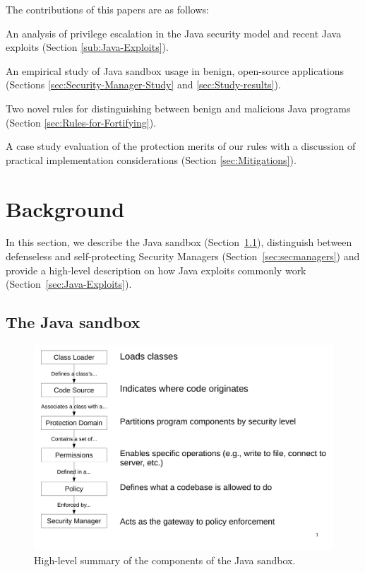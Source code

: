 \documentclass{sig-alternate}
\begin{document}
The contributions of this papers are as follows:
\begin{flushitem}	\setlength{\parskip}{0pt}
  \setlength{\parsep}{0pt}
  \setlength{\itemsep}{0pt}
\item An analysis of privilege escalation in the Java security model and
recent Java exploits (Section \ref{sub:Java-Exploits}).
\item An empirical study of Java sandbox usage in benign, open-source applications
(Sections \ref{sec:Security-Manager-Study} and \ref{sec:Study-results}).
\item Two novel rules for distinguishing between benign and malicious Java
programs (Section \ref{sec:Rules-for-Fortifying}).
\item A case study evaluation of the protection merits of our rules with a discussion of practical implementation considerations (Section \ref{sec:Mitigations}).
\end{flushitem}

\section{Background}\label{sec:Background}

In this section, we describe the Java sandbox
(Section~\ref{sec:sandbox}), distinguish between defenseless and self-protecting
Security Managers (Section~\ref{sec:secmanagers}) and provide a high-level
description on how Java exploits commonly work
(Section~\ref{sec:Java-Exploits}). 

\subsection{The Java sandbox}
\label{sec:sandbox}

\begin{figure}
\includegraphics[width=\columnwidth]{sandbox_overview}
\caption{High-level summary of the components of the Java 
\label{fig:Sandbox-high-level-summary}
sandbox.}
\end{figure}
\end{document}
